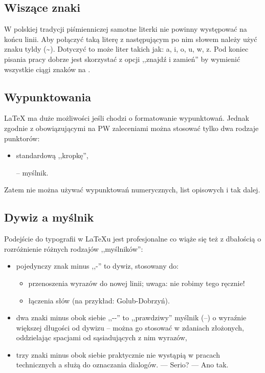 \subsection{Wiszące znaki}
W polskiej tradycji piśmienniczej samotne literki nie powinny występować na końcu linii. Aby połączyć taką literę z następującym po nim słowem należy użyć znaku tyldy (\textasciitilde{}). Dotyczyć to może liter takich jak: a, i, o, u, w, z. Pod koniec pisania pracy dobrze jest skorzystać z opcji ,,znajdź i zamień'' by wymienić wszystkie ciągi znaków  na .


\subsection{Wypunktowania}
\LaTeX{} ma duże możliwości jeśli chodzi o formatowanie wypunktowań. Jednak zgodnie z obowiązującymi na PW zaleceniami można stosować tylko dwa rodzaje punktorów:
\begin{itemize}
	\item standardową ,,kropkę'',
	\item[--] myślnik.
\end{itemize}
Zatem nie można używać wypunktowań numerycznych, list opisowych i tak dalej.


\subsection{Dywiz a myślnik}
Podejście do typografii w \LaTeX{u} jest profesjonalne co wiąże się też z dbałością o rozróżnienie różnych rodzajów ,,myślników'':
\begin{itemize}
	\item pojedynczy znak minus ,,-'' to dywiz, stosowany do:
	      \begin{itemize}
		      \item przenoszenia wyrazów do nowej linii; uwaga: nie robimy tego ręcznie!
		      \item łączenia słów (na przykład: Golub-Dobrzyń).
	      \end{itemize}
	\item dwa znaki minus obok siebie ,,-{}-'' %
	      to ,,prawdziwy'' myślnik (--) o wyraźnie większej długości od dywizu -- można go stosować w zdaniach złożonych, oddzielając spacjami od sąsiadujących z nim wyrazów,
	\item trzy znaki minus obok siebie praktycznie nie wystąpią w pracach technicznych a służą do oznaczania dialogów. --- Serio? --- Ano tak.
\end{itemize}

